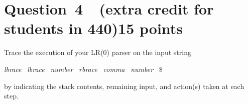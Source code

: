 \documentclass[10pt]{article}
\begin{document}
\section*{Question~4~~(extra credit for students in 440)\hfill 15 points}

Trace the execution of your LR(0) parser on the input string
\begin{center}
\emph{lbrace}  ~\emph{lbrace}  ~\emph{number}  ~\emph{rbrace}
 ~\emph{comma}  ~\emph{number} ~\$
\end{center}
by indicating the stack contents, remaining input, and
action(s) taken at each step.
\end{document}
